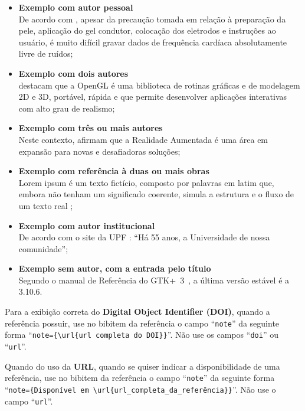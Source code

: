 \begin{itemize}
	\item \textbf{Exemplo com autor pessoal}
	\\ De acordo com \cite{COM10}, apesar da precaução tomada em relação à preparação da pele, aplicação do gel condutor, colocação dos eletrodos e instruções ao usuário, é muito difícil gravar dados de frequência cardíaca absolutamente livre de ruídos;

	\item \textbf{Exemplo com dois autores}
	\\ \cite{COH06} destacam que a OpenGL é uma biblioteca de rotinas gráficas e de modelagem 2D e 3D, portável, rápida e que permite desenvolver aplicações interativas com alto grau de realismo;
	
	\item \textbf{Exemplo com três ou mais autores} 
	\\ Neste contexto, \cite{BOW04} afirmam que a Realidade Aumentada é uma área em expansão para novas e desafiadoras soluções;

	\item \textbf{Exemplo com referência à duas ou mais obras}
	\\ Lorem ipsum é um texto fictício, composto por palavras em latim que, embora não tenham um significado coerente, simula a estrutura e o fluxo de um texto real \citep{RIE111, BENTLEYBC07};
	
	\item \textbf{Exemplo com autor institucional}
	\\ De acordo com o site da UPF \citep{UPF24}: ``Há 55 anos, a Universidade de nossa comunidade'';
	
	\item \textbf{Exemplo sem autor, com a entrada pelo título} \\Segundo o manual de Referência do GTK+~3~\citep{GTK13}, a última versão estável é a 3.10.6.
\end{itemize}

Para a exibição correta do \textbf{Digital Object Identifier (DOI)}, quando a referência possuir, use no bibitem da referência o campo ``\texttt{note}'' da seguinte forma ``\texttt{note=\{\textbackslash url\{url completa do DOI\}\}}''. Não use os campos ``\texttt{doi}'' ou ``\texttt{url}''.

Quando do uso da \textbf{URL}, quando se quiser indicar a disponibilidade de uma referência, use no bibitem da referência o campo ``\texttt{note}'' da seguinte forma ``\texttt{note=\{Disponível em \textbackslash url\{url\_completa\_da\_referência\}\}}''. Não use o campo ``\texttt{url}''.

